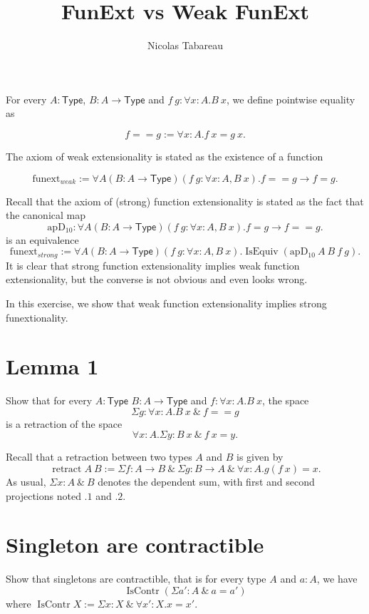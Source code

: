 \documentclass{article}
\newcommand{\Type}{\mathsf{Type}}
\newcommand{\pwEq}{==}
\newcommand{\wFunext}{\mathrm{funext}_{weak}}
\newcommand{\sFunext}{\mathrm{funext}_{strong}}
\newcommand{\apD}{\mathrm{apD_{10}}}
\newcommand{\IsEquiv}{\mathop{\mathrm{IsEquiv}}}
\newcommand{\retractOf}{\mathop{\mathrm{retract}}}
\newcommand{\IsContr}{\mathop{\mathrm{IsContr}}}
\begin{document}
\title{FunExt vs Weak FunExt}

\author{Nicolas Tabareau}

\maketitle


For every $A:\Type$,  $B : A \rightarrow \Type$ and $f \ g : \forall x:A.
B \ x$, we define pointwise equality as 

$$ f \pwEq g := \forall x:A. f \ x = g \ x.$$

\noindent
The axiom of weak extensionality is stated as the existence of a function 

$$
\wFunext := \forall A (B : A \rightarrow \Type) (f \ g : \forall x:A,
B \ x).  f == g \rightarrow f = g.
$$

\noindent
Recall that the axiom of (strong) function extensionality is stated as
the fact that the canonical map 
%
$$
\apD : \forall A (B : A \rightarrow \Type) (f \ g : \forall x:A,
B \ x).  f = g \rightarrow f == g.
$$
%
is an equivalence
%
$$
\sFunext := \forall A (B : A \rightarrow \Type) (f \ g : \forall x:A,
B \ x). \IsEquiv (\apD \ A \ B \ f \ g).
$$
%
It is clear that strong function extensionality implies weak function
extensionality, but the converse is not obvious and even looks wrong.

In this exercise, we show that weak function extensionality implies
strong funextionality.


\section*{Lemma 1} 
Show that for every $A:\Type$  $B : A \rightarrow \Type$ and $f : \forall x:A. B\
x$, the space
$$\Sigma g : \forall x:A. B\ x \ \& \ f == g$$
%
is a retraction of the space
$$\forall x:A.\Sigma y : B \ x \ \& \ f \ x = y.$$


\noindent
Recall that a retraction between two types $A$ and $B$ is given by
$$\retractOf  A \ B := \Sigma f : A \rightarrow B \ \& \ \Sigma g : B \rightarrow A
\ \& \ \forall x:A. g (f \ x) = x.$$
%
As usual, $\Sigma x: A \ \& \ B$ denotes the dependent sum, with first
and second projections noted $.1$ and $.2$.

\section*{Singleton are contractible} 

Show that singletons are contractible, that is for every type $A$ and
$a:A$, we have
%
$$\IsContr (\Sigma a' : A \ \& \ a = a')$$
%
where $\IsContr X := \Sigma x:X \ \& \ \forall x': X. x = x'$.
\end{document}
